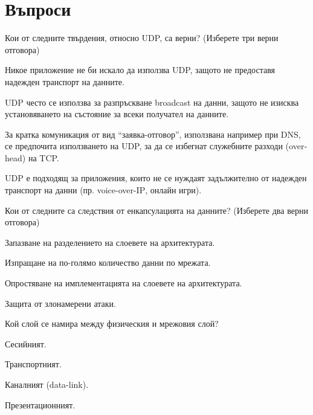 \section*{Въпроси}

\begin{questions}

  \question[7] Кои от следните твърдения, относно UDP, са верни? (Изберете три
  верни отговора)

  \begin{choices}
    \choice Никое приложение не би искало да използва UDP, защото не предоставя
    надежден транспорт на данните.

    \CorrectChoice UDP често се използва за разпръскване
    \foreignlanguage{english}{broadcast} на данни, защото не изисква
    установяването на състояние за всеки получател на данните.

    \CorrectChoice За кратка комуникация от вид "`заявка-отговор"', използвана
    например при DNS, се предпочита използването на UDP, за да се избегнат
    служебните разходи (\foreignlanguage{english}{overhead}) на TCP.

    \CorrectChoice UDP е подходящ за приложения, които не се нуждаят
    задължително от надежден транспорт на данни
    (пр. \foreignlanguage{english}{voice-over-IP}, онлайн игри).
  \end{choices}

  \question[6] Кои от следните са следствия от енкапсулацията на данните?
  (Изберете два верни отговора)

  \begin{choices}
    \CorrectChoice Запазване на разделението на слоевете на архитектурата.

    \choice Изпращане на по-голямо количество данни по мрежата.

    \CorrectChoice Опростяване на имплементацията на слоевете на архитектурата.

    \choice Защита от злонамерени атаки.
  \end{choices}

  \question[6] Кой слой се намира между физическия и мрежовия слой?
  \begin{oneparchoices}
    \choice Сесийният.

    \choice Транспортният.

    \CorrectChoice Каналният (\foreignlanguage{english}{data-link}).

    \choice Презентационният.
  \end{oneparchoices}


\end{questions}

